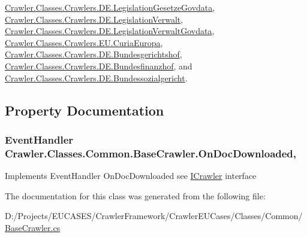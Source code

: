 \hyperlink{class_crawler_1_1_classes_1_1_crawlers_1_1_d_e_1_1_legislation_gesetze_govdata_a4b28d7fd1f22b7d070d21871d4337599}{Crawler.\-Classes.\-Crawlers.\-D\-E.\-Legislation\-Gesetze\-Govdata}, \hyperlink{class_crawler_1_1_classes_1_1_crawlers_1_1_d_e_1_1_legislation_verwalt_a5b4d573f0bfeb2968a806f8342a17c64}{Crawler.\-Classes.\-Crawlers.\-D\-E.\-Legislation\-Verwalt}, \hyperlink{class_crawler_1_1_classes_1_1_crawlers_1_1_d_e_1_1_legislation_verwalt_govdata_a5eecceedce63ecae49d8a19b810d578a}{Crawler.\-Classes.\-Crawlers.\-D\-E.\-Legislation\-Verwalt\-Govdata}, \hyperlink{class_crawler_1_1_classes_1_1_crawlers_1_1_e_u_1_1_curia_europa_a4b2e192e6a1ffeefd1c0b1dac642324f}{Crawler.\-Classes.\-Crawlers.\-E\-U.\-Curia\-Europa}, \hyperlink{class_crawler_1_1_classes_1_1_crawlers_1_1_d_e_1_1_bundesgerichtshof_a22394430f7cfb0ea4da214037fe61703}{Crawler.\-Classes.\-Crawlers.\-D\-E.\-Bundesgerichtshof}, \hyperlink{class_crawler_1_1_classes_1_1_crawlers_1_1_d_e_1_1_bundesfinanzhof_ad603e762fc8e22e2c86a027889fbf004}{Crawler.\-Classes.\-Crawlers.\-D\-E.\-Bundesfinanzhof}, and \hyperlink{class_crawler_1_1_classes_1_1_crawlers_1_1_d_e_1_1_bundessozialgericht_a629080a4171a5b06a46b05cfc8296d95}{Crawler.\-Classes.\-Crawlers.\-D\-E.\-Bundessozialgericht}.



\subsection{Property Documentation}
\hypertarget{class_crawler_1_1_classes_1_1_common_1_1_base_crawler_ad619eb3cb32bf3b604975483370ae9c3}{
\subsubsection[{On\-Doc\-Downloaded}]{\setlength{\rightskip}{0pt plus 5cm}Event\-Handler Crawler.\-Classes.\-Common.\-Base\-Crawler.\-On\-Doc\-Downloaded\hspace{0.3cm}{\ttfamily [add]}, {\ttfamily [remove]}}}\label{class_crawler_1_1_classes_1_1_common_1_1_base_crawler_ad619eb3cb32bf3b604975483370ae9c3}


Implements Event\-Handler On\-Doc\-Downloaded see \hyperlink{interface_crawler_1_1_classes_1_1_common_1_1_i_crawler}{I\-Crawler} interface 



The documentation for this class was generated from the following file\-:\begin{DoxyCompactItemize}
\item 
D\-:/\-Projects/\-E\-U\-C\-A\-S\-E\-S/\-Crawler\-Framework/\-Crawler\-E\-U\-Cases/\-Classes/\-Common/\hyperlink{_base_crawler_8cs}{Base\-Crawler.\-cs}\end{DoxyCompactItemize}
